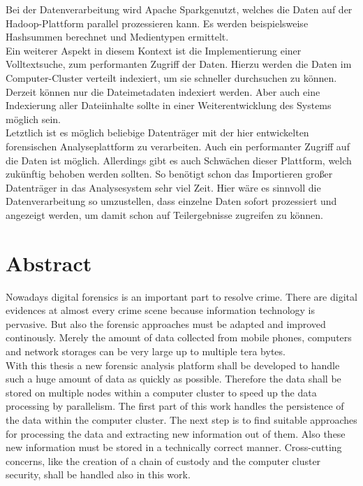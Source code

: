 \noindent
Bei der Datenverarbeitung wird Apache Spark\texttrademark\thinspace genutzt, welches die Daten auf der Hadoop-Plattform parallel prozessieren kann. Es werden beispielsweise Hashsummen berechnet und Medientypen ermittelt.\\
Ein weiterer Aspekt in diesem Kontext ist die Implementierung einer Volltextsuche, zum performanten Zugriff der Daten. Hierzu werden die Daten im Computer-Cluster verteilt indexiert, um sie schneller durchsuchen zu können. Derzeit können nur die Dateimetadaten indexiert werden. Aber auch eine Indexierung aller Dateiinhalte sollte in einer Weiterentwicklung des Systems möglich sein.\\

\noindent
Letztlich ist es möglich beliebige Datenträger mit der hier entwickelten forensischen Analyseplattform zu verarbeiten. Auch ein performanter Zugriff auf die Daten ist möglich. Allerdings gibt es auch Schwächen dieser Plattform, welch zukünftig behoben werden sollten. So benötigt schon das Importieren großer Datenträger in das Analysesystem sehr viel Zeit. Hier wäre es sinnvoll die Datenverarbeitung so umzustellen, dass einzelne Daten sofort prozessiert und angezeigt werden, um damit schon auf Teilergebnisse zugreifen zu können.


\newpage
\section*{Abstract}
Nowadays digital forensics is an important part to resolve crime. There are digital evidences at almost every crime scene because information technology is pervasive. But also the forensic approaches must be adapted and improved continously. Merely the amount of data collected from mobile phones, computers and network storages  can be very large up to multiple tera bytes.\\

\noindent
With this thesis a new forensic analysis platform shall be developed to handle such a huge amount of data as quickly as possible. Therefore the data shall be stored on multiple nodes within a computer cluster to speed up the data processing by parallelism. The first part of this work handles the persistence of the data within the computer cluster. The next step is to find suitable approaches for processing the data and extracting new information out of them. Also these new information must be stored in a technically correct manner. Cross-cutting concerns, like the creation of a chain of custody and the computer cluster security, shall be handled also in this work.\\

